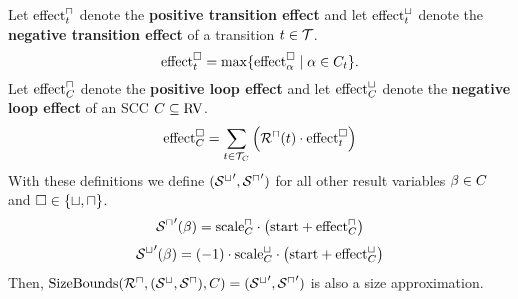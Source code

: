 \begin{theorem}
  Let $\text{effect}^\sqcap_t$ denote the \textbf{positive transition effect} and let $\text{effect}^\sqcup_t$ denote the \textbf{negative transition effect} of a transition $t \in \mathcal{T}$.
  \[ \text{effect}^\square_t = \max \lbrace \text{effect}^\square_\alpha \mid \alpha \in C_t  \rbrace. \]
  Let $\text{effect}^\sqcap_C$ denote the \textbf{positive loop effect} and let $\text{effect}^\sqcup_C$ denote the \textbf{negative loop effect} of an SCC $C \subseteq \text{RV}$.
  \[ \text{effect}^\square_C = \sum_{t \in \mathcal{T}_C} \left( {\mathcal{R}^\sqcap}(t) \cdot \text{effect}^\square_t \right) \]
  With these definitions we define $({\mathcal{S}^\sqcup}', {\mathcal{S}^\sqcap}')$ for all other result variables $\beta \in C$ and $\square \in \lbrace \sqcup, \sqcap \rbrace$.
  \[ {\mathcal{S}^\sqcap}'(\beta) = \text{scale}^\sqcap_C \cdot \left( \text{start} + \text{effect}^\sqcap_C \right) \]
  \[ {\mathcal{S}^\sqcup}'(\beta) = (-1) \cdot \text{scale}^\sqcup_C \cdot \left( \text{start} + \text{effect}^\sqcup_C \right) \]
  Then, $\text{SizeBounds}({\mathcal{R}^\sqcap}, {({\mathcal{S}^\sqcup}, {\mathcal{S}^\sqcap})}, C) = ({\mathcal{S}^\sqcup}', {\mathcal{S}^\sqcap}')$ is also a size approximation. 
\end{theorem}
